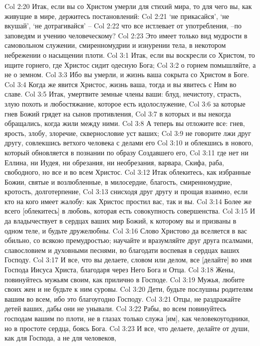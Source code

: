 Col 2:20  Итак, если вы со Христом умерли для стихий мира, то для чего вы, как живущие в мире, держитесь постановлений:
Col 2:21  `не прикасайся', `не вкушай', `не дотрагивайся' --
Col 2:22  что все истлевает от употребления, --по заповедям и учению человеческому?
Col 2:23  Это имеет только вид мудрости в самовольном служении, смиренномудрии и изнурении тела, в некотором небрежении о насыщении плоти.
Col 3:1  Итак, если вы воскресли со Христом, то ищите горнего, где Христос сидит одесную Бога;
Col 3:2  о горнем помышляйте, а не о земном.
Col 3:3  Ибо вы умерли, и жизнь ваша сокрыта со Христом в Боге.
Col 3:4  Когда же явится Христос, жизнь ваша, тогда и вы явитесь с Ним во славе.
Col 3:5  Итак, умертвите земные члены ваши: блуд, нечистоту, страсть, злую похоть и любостяжание, которое есть идолослужение,
Col 3:6  за которые гнев Божий грядет на сынов противления,
Col 3:7  в которых и вы некогда обращались, когда жили между ними.
Col 3:8  А теперь вы отложите все: гнев, ярость, злобу, злоречие, сквернословие уст ваших;
Col 3:9  не говорите лжи друг другу, совлекшись ветхого человека с делами его
Col 3:10  и облекшись в нового, который обновляется в познании по образу Создавшего его,
Col 3:11  где нет ни Еллина, ни Иудея, ни обрезания, ни необрезания, варвара, Скифа, раба, свободного, но все и во всем Христос.
Col 3:12  Итак облекитесь, как избранные Божии, святые и возлюбленные, в милосердие, благость, смиренномудрие, кротость, долготерпение,
Col 3:13  снисходя друг другу и прощая взаимно, если кто на кого имеет жалобу: как Христос простил вас, так и вы.
Col 3:14  Более же всего [облекитесь] в любовь, которая есть совокупность совершенства.
Col 3:15  И да владычествует в сердцах ваших мир Божий, к которому вы и призваны в одном теле, и будьте дружелюбны.
Col 3:16  Слово Христово да вселяется в вас обильно, со всякою премудростью; научайте и вразумляйте друг друга псалмами, славословием и духовными песнями, во благодати воспевая в сердцах ваших Господу.
Col 3:17  И все, что вы делаете, словом или делом, все [делайте] во имя Господа Иисуса Христа, благодаря через Него Бога и Отца.
Col 3:18  Жены, повинуйтесь мужьям своим, как прилично в Господе.
Col 3:19  Мужья, любите своих жен и не будьте к ним суровы.
Col 3:20  Дети, будьте послушны родителям вашим во всем, ибо это благоугодно Господу.
Col 3:21  Отцы, не раздражайте детей ваших, дабы они не унывали.
Col 3:22  Рабы, во всем повинуйтесь господам вашим по плоти, не в глазах только служа [им], как человекоугодники, но в простоте сердца, боясь Бога.
Col 3:23  И все, что делаете, делайте от души, как для Господа, а не для человеков,
